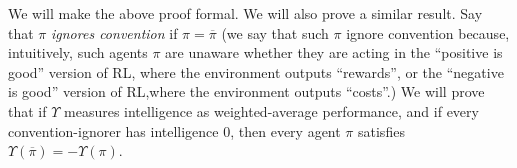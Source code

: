 \documentclass[runningheads]{llncs}
\begin{document}
We will make the above proof formal. We will also prove a similar result.
Say that $\pi$ \emph{ignores convention} if $\pi=\overline\pi$ (we say that such
$\pi$ ignore convention because, intuitively, such agents $\pi$ are unaware whether they
are acting in the ``positive is good'' version of RL, where the environment outputs ``rewards'',
or the ``negative is good'' version of RL,where the environment outputs ``costs''.)
We will prove that if $\Upsilon$ measures intelligence as weighted-average performance,
and if every convention-ignorer has intelligence $0$, then every agent $\pi$ satisfies
$\Upsilon(\overline\pi)=-\Upsilon(\pi)$.





\end{document}

